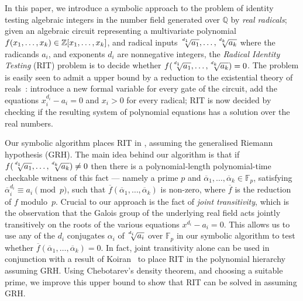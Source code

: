 In this paper, we introduce a symbolic approach to the problem of identity testing algebraic integers in the number field generated over $\mathbb{Q}$ by \emph{real radicals}; given an algebraic circuit  representing a multivariate polynomial $f(x_1,\ldots,x_k)\in\mathbb{Z}[x_1,\ldots,x_k]$, and  radical inputs $\mysqrt{d_1}{a_1},\ldots,\mysqrt{d_k}{a_k}$ where the radicands $a_i$, and exponents $d_i$ are nonnegative integers, the \emph{Radical Identity Testing} (RIT) problem is to decide whether $f(\mysqrt{d_1}{a_1},\ldots,\mysqrt{d_k}{a_k}) = 0$. The problem is easily seen to admit a {\PSPACE} upper bound by a reduction to the existential theory of reals~\cite{canny}: introduce a new formal variable for every gate of the circuit, add the equations $x_i^{d_i} - a_i = 0$ and $x_i > 0$ for every radical; RIT is now decided by checking if the resulting system of polynomial equations has a solution over the real numbers.  

Our symbolic algorithm places RIT in {\coNP}, assuming the generalised Riemann hypothesis (GRH).  The main idea behind our algorithm is that if 
$f(\mysqrt{d_1}{a_1},\ldots,\mysqrt{d_k}{a_k}) \neq 0$
then there is a polynomial-length polynomial-time checkable witness of this fact --- namely a prime $p$ and $\overline{\alpha}_1,\ldots,\overline{\alpha}_k \in \mathbb{F}_p$, satisfying $\overline{\alpha}_i ^ {d_i} \equiv a_i \pmod{p}$, such that $\overline{f}(\overline{\alpha}_1,\ldots,\overline{\alpha}_k )$ is non-zero, where $\overline{f}$ is the reduction of $f$ modulo~$p$. Crucial to our approach is the fact of \emph{joint transitivity}, which is the observation that the Galois group of the underlying real field acts jointly transitively on the roots of the various equations $x^{d_i} - a_i = 0$. This allows us to use any of the $d_i$ conjugates $\alpha_i$ of 
$\mysqrt{d_i}{a_i}$
over $\mathbb{F}_p$ in our symbolic algorithm to test whether $\overline{f}(\overline{\alpha}_1,\ldots,\overline{\alpha}_k ) = 0$. In fact, joint transitivity alone can be used in conjunction with a result of Koiran~\cite{KOIRAN1996273} to place RIT in the polynomial hierarchy assuming GRH.  Using Chebotarev's density theorem, and choosing a suitable prime, we improve this upper bound to show that RIT can be solved in {\coNP} assuming GRH.  

